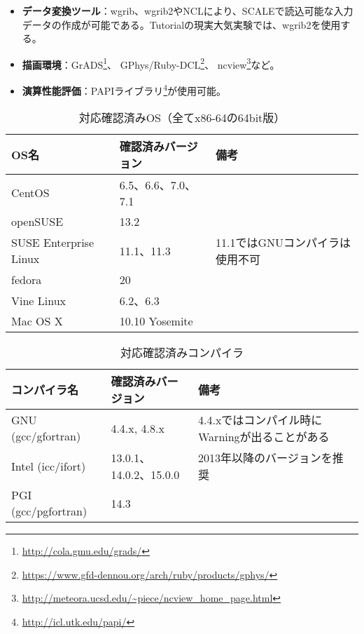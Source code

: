 \begin{itemize}
  \item {\bf データ変換ツール}：wgrib、wgrib2やNCLにより、SCALEで読込可能な入力データの作成が可能である。Tutorialの現実大気実験では、wgrib2を使用する。
  \item {\bf 描画環境}：GrADS\footnote{\url{http://cola.gmu.edu/grads/}}、
GPhys/Ruby-DCL\footnote{\url{https://www.gfd-dennou.org/arch/ruby/products/gphys/}}、
ncview\footnote{\url{http://meteora.ucsd.edu/~piece/ncview\_home\_page.html}}など。
  \item {\bf 演算性能評価}：PAPIライブラリ\footnote{\url{http://icl.utk.edu/papi/}}が使用可能。
\end{itemize}


\begin{table}[htb]
\begin{center}
\caption{対応確認済みOS（全てx86-64の64bit版）}
\begin{tabularx}{150mm}{|l|l|X|} \hline
 \rowcolor[gray]{0.9} OS名 & 確認済みバージョン & 備考 \\ \hline
 CentOS                & 6.5、6.6、7.0、7.1 &  \\ \hline
 openSUSE              & 13.2               &  \\ \hline
 SUSE Enterprise Linux & 11.1、11.3         & 11.1ではGNUコンパイラは使用不可 \\ \hline
 fedora                & 20                 &  \\ \hline
 Vine Linux            & 6.2、6.3           &  \\ \hline
 Mac OS X              & 10.10 Yosemite     &  \\ \hline
\end{tabularx}
\label{tab:compatible_os}
\end{center}
\end{table}

\begin{table}[htb]
\begin{center}
\caption{対応確認済みコンパイラ}
\begin{tabularx}{150mm}{|l|l|X|} \hline
 \rowcolor[gray]{0.9} コンパイラ名 & 確認済みバージョン & 備考 \\ \hline
 GNU (gcc/gfortran)    & 4.4.x, 4.8.x           & 4.4.xではコンパイル時にWarningが出ることがある \\ \hline
 Intel (icc/ifort)     & 13.0.1、14.0.2、15.0.0 & 2013年以降のバージョンを推奨 \\ \hline
 PGI (gcc/pgfortran)   & 14.3                   &  \\ \hline
\end{tabularx}
\label{tab:compatible_compiler}
\end{center}
\end{table}

